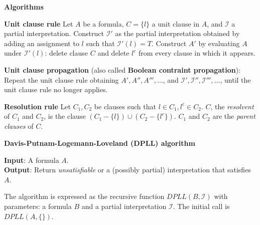 \documentclass[11pt]{report}
\begin{document}
\newpage

\begin{center}
\textbf{Algorithms}
\end{center}

\textbf{Unit clause rule} Let $A$ be a formula, $C=\{l\}$ a unit clause
in $A$, and $\mathcal{I}$ a partial interpretation. Construct
$\mathcal{I}'$ as the partial interpretation obtained by adding an
assignment to $l$ such that $\mathcal{I}'(l)=T$. Construct $A'$ by
evaluating $A$ under $\mathcal{I}'(l)$: delete clause $C$ and delete
$l^{c}$ from every clause in which it appears.

\textbf{Unit clause propagation} (also called \textbf{Boolean contraint
propagation}): Repeat the unit clause rule obtaining $A', A'', A''',
\ldots$, and $\mathcal{I}',\mathcal{I}'',\mathcal{I}''',\ldots$, until
the unit clause rule no longer applies.

\textbf{Resolution rule} Let $C_{1},C_{2}$ be clauses such that $l\in
C_{1},l^{c}\in C_{2}$. $C$, the \emph{resolvent} of $C_{1}$ and $C_{2}$,
is the clause $(C_{1}-\{l\}) \cup (C_{2}-\{l^{c}\})$. $C_{1}$ and
$C_{2}$ are the \emph{parent clauses} of $C$.

\bigskip

\textbf{Davis-Putnam-Logemann-Loveland (DPLL) algorithm}

\textbf{Input}: A formula $A$.\\
\textbf{Output}: Return \emph{unsatisfiable} or a (possibly partial)
interpretation that satisfies $A$.

The algorithm is expressed as the recursive function
$\textit{DPLL}(B,\mathcal{I})$ with parameters: a formula $B$ and a
partial interpretation $\mathcal{I}$. The initial call is
$\textit{DPLL}(A,\{\})$.
\end{document}
